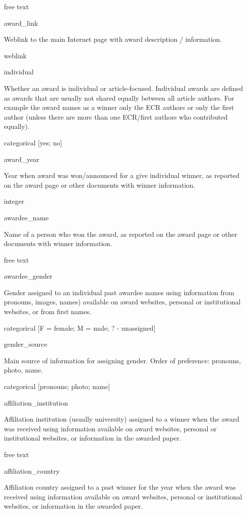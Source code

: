 \documentclass[
]{article}
\begin{document}
free text

award\_link

Weblink to the main Internet page with award description / information.

weblink

individual

Whether an award is individual or article-focused. Individual awards are
defined as awards that are usually not shared equally between all
article authors. For example the award names as a winner only the ECR
authors or only the first author (unless there are more than one
ECR/first authors who contributed equally).

categorical {[}yes; no{]}

award\_year

Year when award was won/announced for a give individual winner, as
reported on the award page or other documents with winner information.

integer

awardee\_name

Name of a person who won the award, as reported on the award page or
other documents with winner information.

free text

awardee\_gender

Gender assigned to an individual past awardee names using information
from pronouns, images, names) available on award websites, personal or
institutional websites, or from first names.

categorical {[}F = female; M = male; ? - unassigned{]}

gender\_source

Main source of information for assigning gender. Order of preference:
pronouns, photo, name.

categorical {[}pronouns; photo; name{]}

affiliation\_institution

Affiliation institution (usually university) assigned to a winner when
the award was received using information available on award websites,
personal or institutional websites, or information in the awarded paper.

free text

affiliation\_country

Affiliation country assigned to a past winner for the year when the
award was received using information available on award websites,
personal or institutional websites, or information in the awarded paper.
\end{document}
